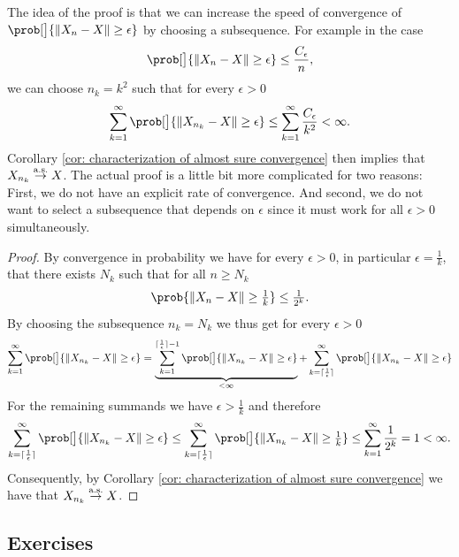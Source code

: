 The idea of the proof is that we can increase the speed of convergence
of \(\prob[\big]{\norm{X_n - X} \ge \epsilon}\) by choosing a subsequence.
For example in the case
\[
    \prob[\big]{\norm{X_n - X} \ge \epsilon} \le \frac{C_\epsilon}{n},
\]
we can choose \(n_k = k^2\) such that for every \(\epsilon > 0\)
\begin{equation}
    \label{eq: subsequence summable}    
    \sum_{k=1}^\infty \prob[\big]{\norm{X_{n_k} - X} \ge \epsilon}
    \le \sum_{k=1}^\infty \frac{C_\epsilon}{k^2} < \infty.
\end{equation}
Corollary \ref{cor: characterization of almost sure convergence} then
implies that \(X_{n_k} \overset{\operatorname{\text{a.s.}}}\to X\).
The actual proof is a little bit more complicated for two reasons: First, we do
not have an explicit rate of convergence. And second, we do not want to select a
subsequence that depends on \(\epsilon\) since it must work for all \(\epsilon >
0\) simultaneously.


\begin{proof}
    By convergence in probability we have for every \(\epsilon >0\),
    in particular \(\epsilon =\frac1k\), that
    there exists \(N_k\) such that for all \(n \ge N_k\)
    \[
        \prob{\norm{X_n - X} \ge \tfrac1k} \le \tfrac1{2^k}.
    \]
    By choosing the subsequence \(n_k = N_k\) we thus get
    for every \(\epsilon > 0\)
    \[
        \sum_{k=1}^\infty \prob[\big]{\norm{X_{n_k} - X} \ge \epsilon}
        = \underbrace{\sum_{k=1}^{\lceil \frac1\epsilon \rceil-1}
        \prob[\big]{\norm{X_{n_k} - X} \ge \epsilon}}_{< \infty}
        +\sum_{k=\lceil \frac1\epsilon \rceil}^\infty
        \prob[\big]{\norm{X_{n_k} - X} \ge \epsilon}
    \]
    For the remaining summands we have \(\epsilon > \frac1k\) and therefore
    \[
       \sum_{k=\lceil \frac1\epsilon \rceil}^\infty
        \prob[\big]{\norm{X_{n_k} - X} \ge \epsilon}
        \le \sum_{k=\lceil \frac1\epsilon \rceil}^\infty
        \prob[\big]{\norm{X_{n_k} - X} \ge \tfrac1k}
        \le \sum_{k=1}^\infty \frac1{2^k} = 1 < \infty.
    \]
    Consequently, by Corollary \ref{cor: characterization of almost sure convergence}
    we have that \(X_{n_k} \overset{\operatorname{\text{a.s.}}}\to X\).
\end{proof}

\subsection*{Exercises}

